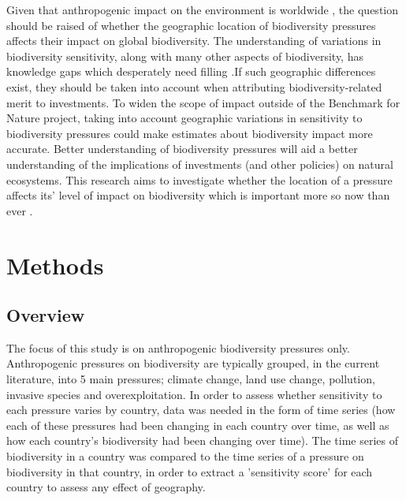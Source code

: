 \documentclass[11pt, a4paper, titlepage]{article}
\begin{document}
   	 Given that anthropogenic impact on the environment is worldwide \citep{plumptre2021might}, the question should be raised of whether the geographic location of biodiversity pressures affects their impact on global biodiversity. The understanding of variations in biodiversity sensitivity, along with many other aspects of biodiversity, has knowledge gaps which desperately need filling \citep{pereira2012global}.If such geographic differences exist, they should be taken into account when attributing biodiversity-related merit to investments. To widen the scope of impact outside of the Benchmark for Nature project, taking into account geographic variations in sensitivity to biodiversity pressures could make estimates about biodiversity impact more accurate. Better understanding of biodiversity pressures will aid a better understanding of the implications of investments (and other policies) on natural ecosystems.  This research aims to investigate whether the location of a pressure affects its' level of impact on biodiversity which is important more so now than ever \citep{ceballos2015accelerated}. \newline



   	\newpage

    \section*{Methods}

	\subsection*{Overview}

	The focus of this study is on anthropogenic biodiversity pressures only. Anthropogenic pressures on biodiversity are typically grouped, in the current literature, into 5 main pressures; climate change, land use change, pollution, invasive species and overexploitation. In order to assess whether sensitivity to each pressure varies by country, data was needed in the form of time series (how each of these pressures had been changing in each country over time, as well as how each country's biodiversity had been changing over time). The time series of biodiversity in a country was compared to the time series of a pressure on biodiversity in that country, in order to extract a 'sensitivity score' for each country to assess any effect of geography. \newline
	
\end{document}
